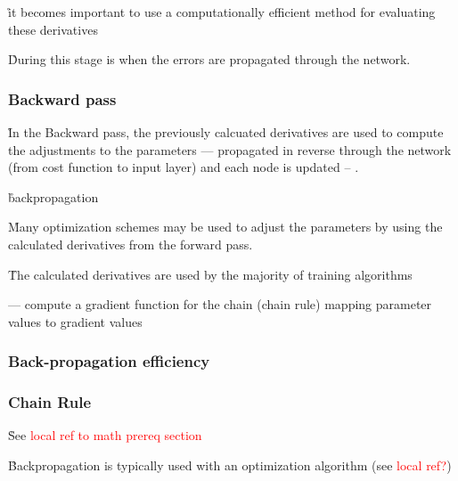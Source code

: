 \r{it becomes important to use a computationally efficient method for evaluating these derivatives }

\r{During this stage is when the errors are propagated through the network.}

\subsubsection{Backward pass}

\r{In the Backward pass, the previously calcuated derivatives are used to compute the adjustments to the parameters --- propagated in reverse through the network (from cost function to input layer) and each node is updated -- .}

\r{backpropagation\cite{alber2018backprop}}

\r{Many optimization schemes  may be used to adjust the parameters by using the calculated derivatives from the forward pass.}

\r{The calculated derivatives are used by the majority of training algorithms}







\r{ --- compute a gradient function for the chain (chain rule) mapping parameter values to gradient values}

\subsubsection{Back-propagation efficiency}


\subsubsection{Chain Rule}

\r{See \textcolor{red}{local ref to math prereq section}}


\r{Backpropagation is typically used with an optimization algorithm (see \textcolor{red}{local ref?})}

